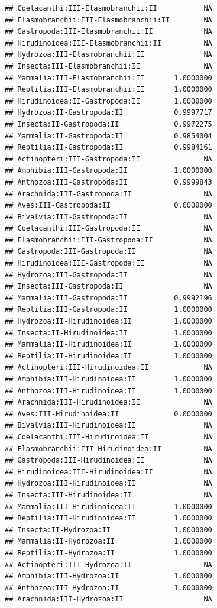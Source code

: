 \documentclass[
  12pt,
]{article}
\begin{document}
\begin{verbatim}
## Coelacanthi:III-Elasmobranchii:II           NA
## Elasmobranchii:III-Elasmobranchii:II        NA
## Gastropoda:III-Elasmobranchii:II            NA
## Hirudinoidea:III-Elasmobranchii:II          NA
## Hydrozoa:III-Elasmobranchii:II              NA
## Insecta:III-Elasmobranchii:II               NA
## Mammalia:III-Elasmobranchii:II       1.0000000
## Reptilia:III-Elasmobranchii:II       1.0000000
## Hirudinoidea:II-Gastropoda:II        1.0000000
## Hydrozoa:II-Gastropoda:II            0.9997717
## Insecta:II-Gastropoda:II             0.9972275
## Mammalia:II-Gastropoda:II            0.9854004
## Reptilia:II-Gastropoda:II            0.9984161
## Actinopteri:III-Gastropoda:II               NA
## Amphibia:III-Gastropoda:II           1.0000000
## Anthozoa:III-Gastropoda:II           0.9999843
## Arachnida:III-Gastropoda:II                 NA
## Aves:III-Gastropoda:II               0.0000000
## Bivalvia:III-Gastropoda:II                  NA
## Coelacanthi:III-Gastropoda:II               NA
## Elasmobranchii:III-Gastropoda:II            NA
## Gastropoda:III-Gastropoda:II                NA
## Hirudinoidea:III-Gastropoda:II              NA
## Hydrozoa:III-Gastropoda:II                  NA
## Insecta:III-Gastropoda:II                   NA
## Mammalia:III-Gastropoda:II           0.9992196
## Reptilia:III-Gastropoda:II           1.0000000
## Hydrozoa:II-Hirudinoidea:II          1.0000000
## Insecta:II-Hirudinoidea:II           1.0000000
## Mammalia:II-Hirudinoidea:II          1.0000000
## Reptilia:II-Hirudinoidea:II          1.0000000
## Actinopteri:III-Hirudinoidea:II             NA
## Amphibia:III-Hirudinoidea:II         1.0000000
## Anthozoa:III-Hirudinoidea:II         1.0000000
## Arachnida:III-Hirudinoidea:II               NA
## Aves:III-Hirudinoidea:II             0.0000000
## Bivalvia:III-Hirudinoidea:II                NA
## Coelacanthi:III-Hirudinoidea:II             NA
## Elasmobranchii:III-Hirudinoidea:II          NA
## Gastropoda:III-Hirudinoidea:II              NA
## Hirudinoidea:III-Hirudinoidea:II            NA
## Hydrozoa:III-Hirudinoidea:II                NA
## Insecta:III-Hirudinoidea:II                 NA
## Mammalia:III-Hirudinoidea:II         1.0000000
## Reptilia:III-Hirudinoidea:II         1.0000000
## Insecta:II-Hydrozoa:II               1.0000000
## Mammalia:II-Hydrozoa:II              1.0000000
## Reptilia:II-Hydrozoa:II              1.0000000
## Actinopteri:III-Hydrozoa:II                 NA
## Amphibia:III-Hydrozoa:II             1.0000000
## Anthozoa:III-Hydrozoa:II             1.0000000
## Arachnida:III-Hydrozoa:II                   NA

\end{verbatim}
\end{document}
